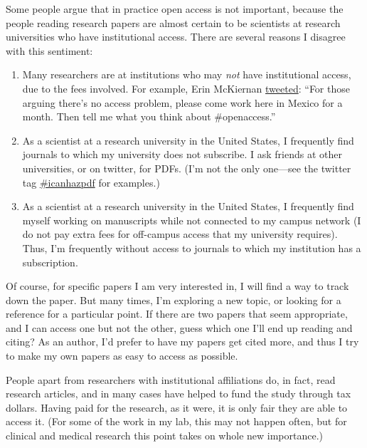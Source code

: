 \documentclass[letterpaper,oneside,11pt,article, portrait]{memoir}
\begin{document}
Some people argue that in practice open access is not important, because the people reading research papers are almost certain to be scientists at research universities who have institutional access. There are several reasons I disagree with this sentiment:

\begin{enumerate}

\item Many researchers are at institutions who may \textit{not} have institutional access, due to the fees involved. For example, Erin McKiernan \href{https://twitter.com/emckiernan13/status/706204056323100672}{tweeted}: ``For those arguing there's no access problem, please come work here in Mexico for a month. Then tell me what you think about \#openaccess.''

\item As a scientist at a research university in the United States, I frequently find journals to which my university does not subscribe. I ask friends at other universities, or on twitter, for PDFs. (I'm not the only one---see the twitter tag \href{https://twitter.com/search?q=\%23icanhazpdf}{\#icanhazpdf} for examples.)

\item As a scientist at a research university in the United States, I frequently find myself working on manuscripts while not connected to my campus network (I do not pay extra fees for off-campus access that my university requires). Thus, I'm frequently without access to journals to which my institution has a subscription.
\end{enumerate}

Of course, for specific papers I am very interested in, I will find a way to track down the paper. But many times, I'm exploring a new topic, or looking for a reference for a particular point. If there are two papers that seem appropriate, and I can access one but not the other, guess which one I'll end up reading and citing? As an author, I'd prefer to have my papers get cited more, and thus I try to make my own papers as easy to access as possible.

People apart from researchers with institutional affiliations do, in fact, read research articles, and in many cases have helped to fund the study through tax dollars. Having paid for the research, as it were, it is only fair they are able to access it. (For some of the work in my lab, this may not happen often, but for clinical and medical research this point takes on whole new importance.)
\end{document}
